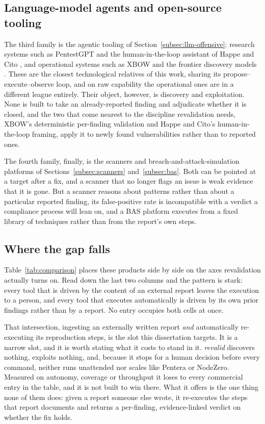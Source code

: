 \subsection{Language-model agents and open-source tooling}
\label{subsec:sota-agents}

The third family is the agentic tooling of Section~\ref{subsec:llm-offensive}:
research systems such as PentestGPT \cite{deng2024pentestgpt} and the human-in-the-loop
assistant of Happe and Cito \cite{happe2023}, and operational systems such as XBOW
\cite{xbow} and the frontier discovery models \cite{anthropic_mythos, aisi_mythos}.
These are the closest technological relatives of this work, sharing its propose--execute--observe
loop, and on raw capability the operational ones are in a different league entirely.
Their object, however, is discovery and exploitation. None is built to take an
already-reported finding and adjudicate whether it is closed, and the two that come
nearest to the discipline revalidation needs, XBOW's deterministic per-finding
validation and Happe and Cito's human-in-the-loop framing, apply it to newly found
vulnerabilities rather than to reported ones.

The fourth family, finally, is the scanners and breach-and-attack-simulation platforms
of Sections~\ref{subsec:scanners} and~\ref{subsec:bas}. Both can be pointed at a target
after a fix, and a scanner that no longer flags an issue is weak evidence that it is
gone. But a scanner reasons about patterns rather than about a particular reported
finding, its false-positive rate is incompatible with a verdict a compliance process
will lean on, and a BAS platform executes from a fixed library of techniques rather than
from the report's own steps.

\subsection{Where the gap falls}
\label{subsec:sota-gap}

Table~\ref{tab:comparison} places these products side by side on the axes revalidation
actually turns on. Read down the last two columns and the pattern is stark: every tool
that is driven by the content of an external report leaves the execution to a person,
and every tool that executes automatically is driven by its own prior findings rather
than by a report. No entry occupies both cells at once.

That intersection, ingesting an externally written report \emph{and} automatically
re-executing its reproduction steps, is the slot this dissertation targets. It is a
narrow slot, and it is worth stating what it costs to stand in it. \emph{revalid}
discovers nothing, exploits nothing, and, because it stops for a human decision before
every command, neither runs unattended nor scales like Pentera or NodeZero. Measured on
autonomy, coverage or throughput it loses to every commercial entry in the table, and it
is not built to win there. What it offers is the one thing none of them does: given a
report someone else wrote, it re-executes the steps that report documents and returns a
per-finding, evidence-linked verdict on whether the fix holds.


